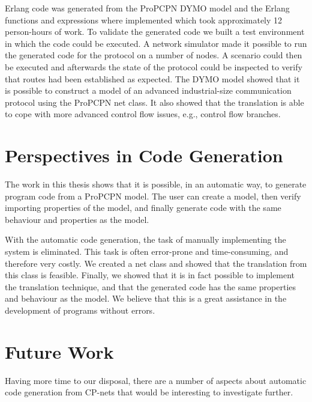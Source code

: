 Erlang code was generated from the ProPCPN DYMO model and the Erlang functions and expressions where implemented which took approximately 12 person-hours of work. To validate the generated code we built a test environment in which the code could be executed. A network simulator made it possible to run the generated code for the protocol on a number of nodes. A scenario could then be executed and afterwards the state of the protocol could be inspected to verify that routes had been established as expected. The DYMO model showed that it is possible to construct a model of an advanced industrial-size communication protocol using the ProPCPN net class. It also showed that the translation is able to cope with more advanced control flow issues, e.g., control flow branches.

\section{Perspectives in Code Generation}
The work in this thesis shows that it is possible, in an automatic way, to generate program code from a ProPCPN model. The user can create a model, then verify importing properties of the model, and finally generate code with the same behaviour and properties as the model.

With the automatic code generation, the task of manually implementing the system is eliminated. This task is often error-prone and time-consuming, and therefore very costly. We created a net class and showed that the translation from this class is feasible. Finally, we showed that it is in fact possible to implement the translation technique, and that the generated code has the same properties and behaviour as the model. We believe that this is a great assistance in the development of programs without errors.

\section{Future Work}
\label{futurework}

Having more time to our disposal, there are a number of aspects about automatic code generation from CP-nets that would be interesting to investigate further.

